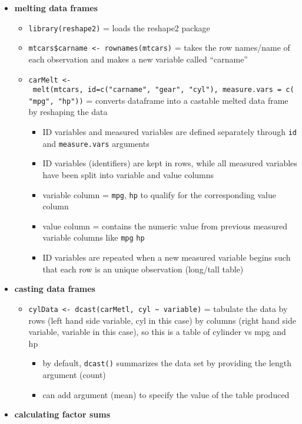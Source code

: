 \documentclass[
]{article}
\providecommand{\tightlist}{%
  \setlength{\itemsep}{0pt}\setlength{\parskip}{0pt}}
\begin{document}
\begin{itemize}
\tightlist
\item
  \textbf{melting data frames}

  \begin{itemize}
  \tightlist
  \item
    \texttt{library(reshape2)} = loads the reshape2 package
  \item
    \texttt{mtcars\$carname\ \textless{}-\ rownames(mtcars)} = takes the
    row names/name of each observation and makes a new variable called
    ``carname''
  \item
    \texttt{carMelt\ \textless{}-\ melt(mtcars,\ id=c("carname",\ "gear",\ "cyl"),\ measure.vars\ =\ c("mpg",\ "hp"))}
    = converts dataframe into a castable melted data frame by reshaping
    the data

    \begin{itemize}
    \tightlist
    \item
      ID variables and measured variables are defined separately through
      \texttt{id} and \texttt{measure.vars} arguments
    \item
      ID variables (identifiers) are kept in rows, while all measured
      variables have been split into variable and value columns
    \item
      variable column = \texttt{mpg}, \texttt{hp} to qualify for the
      corresponding value column
    \item
      value column = contains the numeric value from previous measured
      variable columns like \texttt{mpg} \texttt{hp}
    \item
      ID variables are repeated when a new measured variable begins such
      that each row is an unique observation (long/tall table)
    \end{itemize}
  \end{itemize}
\item
  \textbf{casting data frames}

  \begin{itemize}
  \tightlist
  \item
    \texttt{cylData\ \textless{}-\ dcast(carMetl,\ cyl\ \textasciitilde{}\ variable)}
    = tabulate the data by rows (left hand side variable, cyl in this
    case) by columns (right hand side variable, variable in this case),
    so this is a table of cylinder vs mpg and hp

    \begin{itemize}
    \tightlist
    \item
      by default, \texttt{dcast()} summarizes the data set by providing
      the length argument (count)
    \item
      can add argument (mean) to specify the value of the table produced
    \end{itemize}
  \end{itemize}
\item
  \textbf{calculating factor sums}


\end{itemize}
\end{document}
